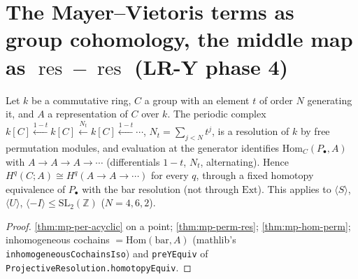 \section{The Mayer--Vietoris terms as group cohomology, the middle map as \texorpdfstring{$\operatorname{res}-\operatorname{res}$}{res - res} (LR-Y phase 4)}

\begin{theorem}\label{thm:mp-cyc-coh}
  \leanok
  Let $k$ be a commutative ring, $C$ a group with an element $t$ of order $N$ generating it, and $A$ a representation of $C$
  over $k$.  The periodic complex $k[C]\xleftarrow{1-t}k[C]\xleftarrow{N_t}k[C]\xleftarrow{1-t}\cdots$, $N_t=\sum_{j<N}t^j$,
  is a resolution of $k$ by free permutation modules, and evaluation at the generator identifies $\mathrm{Hom}_C(P_\bullet,A)$
  with $A\to A\to A\to\cdots$ (differentials $1-t$, $N_t$, alternating).  Hence $H^q(C;A)\cong H^q(A\to A\to\cdots)$ for every
  $q$, through a fixed homotopy equivalence of $P_\bullet$ with the bar resolution (not through $\mathrm{Ext}$).  This applies to
  $\langle S\rangle$, $\langle U\rangle$, $\langle-I\rangle\le\mathrm{SL}_2(\mathbb Z)$ ($N=4,6,2$).
\end{theorem}
\begin{proof}
  \leanok
  \ref{thm:mp-per-acyclic} on a point; \ref{thm:mp-perm-res}; \ref{thm:mp-hom-perm}; inhomogeneous cochains $=\mathrm{Hom}(\mathrm{bar},A)$
  (mathlib's \texttt{inhomogeneousCochainsIso}) and \texttt{preYEquiv} of \texttt{ProjectiveResolution.homotopyEquiv}.
\end{proof}

